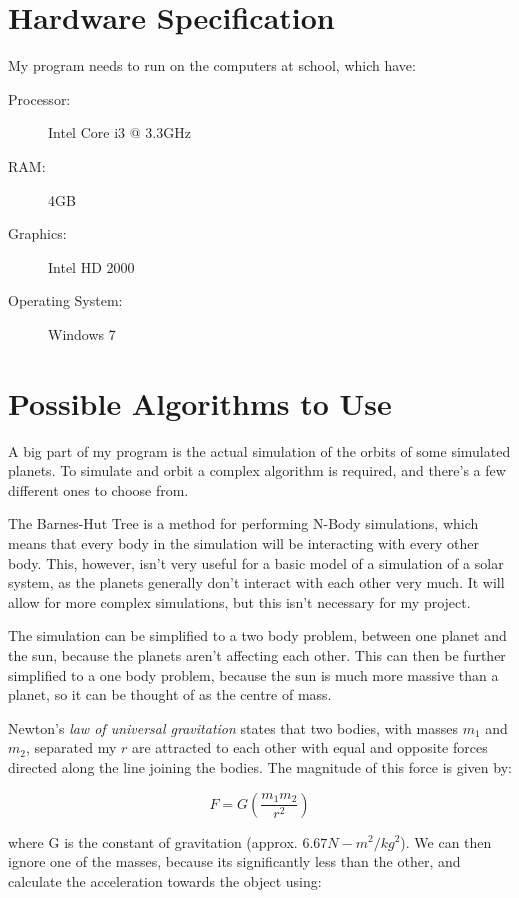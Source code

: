 \section{Hardware Specification}

My program needs to run on the computers at school, which have:
\begin{description}
	\item[Processor:] Intel Core i3 @ 3.3GHz
	\item[RAM:] 4GB
	\item[Graphics:] Intel HD 2000
	\item[Operating System:] Windows 7
\end{description}

\section{Possible Algorithms to Use}

A big part of my program is the actual simulation of the orbits of some
simulated planets. To simulate and orbit a complex algorithm is required, and
there's a few different ones to choose from.

The Barnes-Hut Tree is a method for performing N-Body simulations, which means
that every body in the simulation will be interacting with every other body.
This, however, isn't very useful for a basic model of a simulation of a solar
system, as the planets generally don't interact with each other very much. It
will allow for more complex simulations, but this isn't necessary for my
project.

The simulation can be simplified to a two body problem, between one planet and
the sun, because the planets aren't affecting each other. This can then be
further simplified to a one body problem, because the sun is much more massive
than a planet, so it can be thought of as the centre of mass. 

Newton's \emph{law of universal gravitation} states that two bodies, with masses
$m_1$ and $m_2$, separated my $r$ are attracted to each other with equal and
opposite forces directed along the line joining the bodies. The magnitude of
this force is given by:

\begin{equation}
	F = G (\frac{m_1 m_2}{r^2})	
\end{equation}

where G is the constant of gravitation (approx. $6.67 N-m^2/kg^2$). We can then
ignore one of the masses, because its significantly less than the other, and
calculate the acceleration towards the object using:

